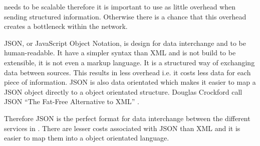 \projectname{} needs to be scalable therefore it is important to use as little overhead when sending structured information.
Otherwise there is a chance that this overhead creates a bottleneck within the network.

JSON, or JavaScript Object Notation, is design for data interchange and to be human-readable.
It have a simpler syntax than XML and is not build to be extensible, it is not even a markup language. 
It is a structured way of exchanging data between sources. 
This results in less overhead i.e. it costs less data for each piece of information. 
JSON is also data orientated which makes it easier to map a JSON object directly to a object orientated structure.
Douglas Crockford call JSON ``The Fat-Free Alternative to XML'' \citep{JSON}.

Therefore JSON is the perfect format for data interchange between the different services in \projectname{}. There are lesser costs associated with JSON than XML and it is easier to map them into a object orientated language.